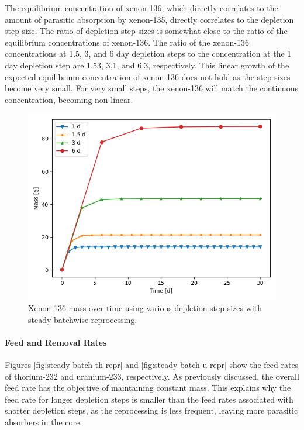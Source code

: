 {The equilibrium concentration of xenon-136, which directly correlates to the amount of parasitic absorption by xenon-135, directly correlates to the depletion step size.
The ratio of depletion step sizes is somewhat close to the ratio of the equilibrium concentrations of xenon-136.
The ratio of the xenon-136 concentrations at 1.5, 3, and 6 day depletion steps to the concentration at the 1 day depletion step are 1.53, 3.1, and 6.3, respectively.
This linear growth of the expected equilibrium concentration of xenon-136 does not hold as the step sizes become very small.
For very small steps, the xenon-136 will match the continuous concentration, becoming non-linear.

\begin{figure}[H]
  \centering
  \includegraphics[scale=0.7]{images/Xe136_sp_comp.png}
  \caption{Xenon-136 mass over time using various depletion step sizes with steady batchwise reprocessing.}
   \label{fig:steady-batch-xe136}
\end{figure}

\paragraph*{Feed and Removal Rates}

Figures \ref{fig:steady-batch-th-repr} and \ref{fig:steady-batch-u-repr} show the feed rates of thorium-232 and uranium-233, respectively. As previously discussed, the overall feed rate has the objective of maintaining constant mass. This explains why the feed rate for longer depletion steps is smaller than the feed rates associated with shorter depletion steps, as the reprocessing is less frequent, leaving more parasitic absorbers in the core. 

}
